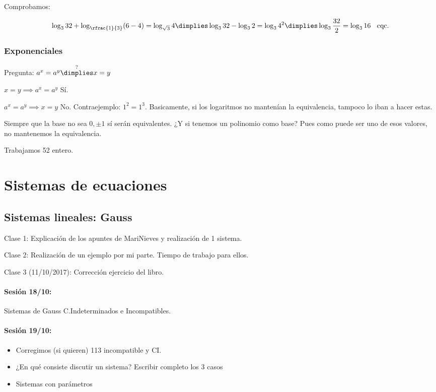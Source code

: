 Comprobamos:

\[
	\log_332+\log_{\rfrac{1}{3}}(6-4) = \log_{\sqrt{3}}4 \dimplies \log_332-\log_32=\log_34^2 \dimplies \log_3\frac{32}{2}=\log_316 \;\;\text{   cqc.}
\]




\subsubsection{Exponenciales}

Pregunta: $a^x=a^y \overset{?}{\dimplies} x=y$

$x=y\implies a^x=a^y$ Sí.

$a^x=a^y\implies x=y$ No. Contraejemplo: $1^2=1^3$.  Basicamente, si los logaritmos no mantenían la equivalencia, tampoco lo iban a hacer estas.

Siempre que la base no sea $0,±1$ sí serán equivalentes. ¿Y si tenemos un polinomio como base? Pues como puede ser uno de esos valores, no mantenemos la equivalencia.

Trabajamos 52 entero.

\section{Sistemas de ecuaciones}

\subsection{Sistemas lineales: Gauss}


Clase 1: Explicación de los apuntes de MariNieves y realización de 1 sistema.

Clase 2: Realización de un ejemplo por mi parte. Tiempo de trabajo para ellos.

Clase 3 (11/10/2017): Corrección ejercicio del libro.

\paragraph{Sesión 18/10:} Sistemas de Gauss C.Indeterminados e Incompatibles.

\paragraph{Sesión 19/10:} 
\begin{itemize}
	\item Corregimos (si quieren) 113 incompatible y CI.
	\item ¿En qué consiste discutir un sistema? Escribir completo los 3 casos
	\item Sistemas con parámetros
\end{itemize}

